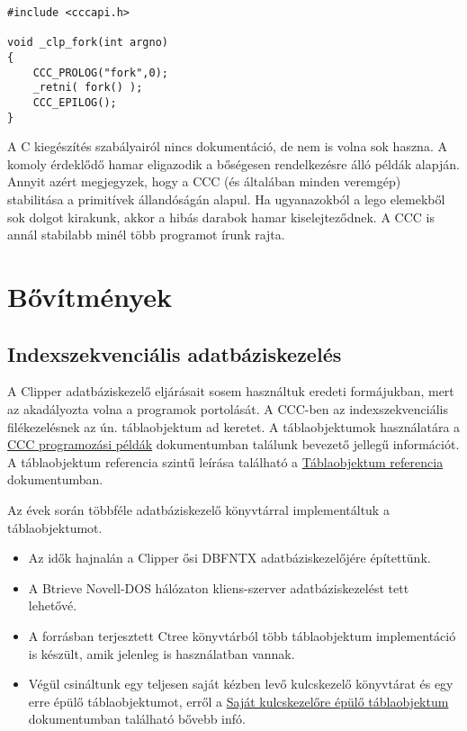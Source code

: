 \begin{verbatim}
#include <cccapi.h>

void _clp_fork(int argno) 
{
    CCC_PROLOG("fork",0);
    _retni( fork() );
    CCC_EPILOG();
}
\end{verbatim}

A C kiegészítés szabályairól nincs dokumentáció, de nem is volna
sok haszna. A komoly érdeklődő hamar eligazodik a bőségesen
rendelkezésre álló példák alapján. Annyit azért megjegyzek,
hogy a CCC (és általában minden veremgép) stabilitása 
a primitívek állandóságán alapul. Ha ugyanazokból a
lego elemekből sok dolgot kirakunk, akkor a hibás darabok hamar 
kiselejteződnek. A CCC is annál stabilabb minél több programot
írunk rajta.


\section{Bővítmények}


\subsection{Indexszekvenciális adatbáziskezelés}

A Clipper adatbáziskezelő eljárásait sosem használtuk eredeti 
formájukban, mert az akadályozta volna a programok  portolását.
A CCC-ben az indexszekvenciális filékezelésnek az ún.
táblaobjektum ad keretet. A táblaobjektumok használatára
a \href{cccapix.html}{CCC programozási példák} dokumentumban
találunk bevezető jellegű információt. A táblaobjektum
referencia szintű leírása található a 
\href{tabobj.html}{Táblaobjektum referencia} dokumentumban.

Az évek során többféle adatbáziskezelő könyvtárral
implementáltuk a táblaobjektumot. 
\begin{itemize} 
\item 
   Az idők hajnalán a Clipper ősi DBFNTX adatbáziskezelőjére
   építettünk.
\item
   A Btrieve Novell-DOS hálózaton kliens-szerver adatbáziskezelést
   tett lehetővé.
\item 
   A forrásban terjesztett Ctree könyvtárból több táblaobjektum
   implementáció is készült, amik jelenleg is használatban vannak.
\item
   Végül csináltunk egy teljesen saját kézben levő
   kulcskezelő könyvtárat és egy erre épülő táblaobjektumot,
   erről a \href{btbtx.html}{Saját kulcskezelőre épülő táblaobjektum} 
   dokumentumban található bővebb infó.
\end{itemize} 

